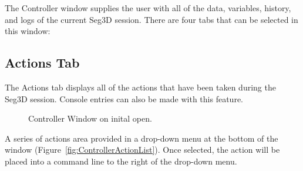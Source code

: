\documentclass[fleqn,11pt,openany]{book}
\begin{document}
The Controller window supplies the user with all of the data, variables, history, and logs of the current Seg3D session.
There are four tabs that can be selected in this window:

\subsection{Actions Tab}
The Actions tab displays all of the actions that have been taken during the Seg3D session.
Console entries can also be made with this feature.

\begin{figure}[h]
\caption{Controller Window on inital open.}\label{fig:OnStartup}
\end{figure}

A series of actions area provided in a drop-down menu at the bottom of the window (Figure~\ref{fig:ControllerActionList}).
Once selected, the action will be placed into a command line to the right of the drop-down menu.
\end{document}
